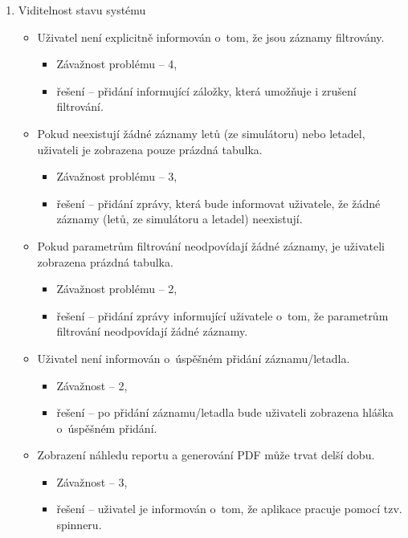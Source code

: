 \documentclass[thesis=M,czech]{FITthesis}[2012/06/26]
\begin{document}
\begin{enumerate}

\item Viditelnost stavu systému 
\begin{itemize}
	\item Uživatel není explicitně informován o~tom, že jsou záznamy filtrovány.
 	\begin{itemize}
 		\item Závažnost problému -- 4,
 		\item řešení -- přidání informující záložky, která umožňuje i zrušení filtrování.
 	\end{itemize}
 	\item Pokud neexistují žádné záznamy letů (ze simulátoru) nebo letadel, uživateli je zobrazena pouze prázdná tabulka.
 	\begin{itemize}
 		\item Závažnost problému -- 3,
 		\item řešení -- přidání zprávy, která bude informovat uživatele, že žádné záznamy (letů, ze simulátoru a letadel) neexistují.
 	\end{itemize}
 	\item Pokud parametrům filtrování neodpovídají žádné záznamy, je uživateli zobrazena prázdná tabulka.
 	\begin{itemize}
 		\item Závažnost problému -- 2,
 		\item řešení -- přidání zprávy informující uživatele o~tom, že parametrům filtrování neodpovídají žádné záznamy. 	
 	\end{itemize}
 	\item Uživatel není informován o~úspěšném přidání záznamu/letadla.
 	\begin{itemize}
 		\item Závažnost -- 2,
 		\item řešení -- po přidání záznamu/letadla bude uživateli zobrazena hláška o~úspěšném přidání.
 	\end{itemize}
 	\item Zobrazení náhledu reportu a generování PDF může trvat delší dobu.
 	\begin{itemize}
 		\item Závažnost -- 3,
 		\item řešení -- uživatel je informován o~tom, že aplikace pracuje pomocí tzv. spinneru. 
 	\end{itemize}
\end{itemize}
 

\end{enumerate}
\end{document}
